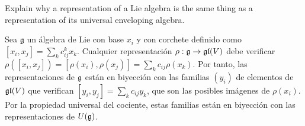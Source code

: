 \documentclass[twoside]{article}
\begin{document}
\begin{ejercicio}{}
Explain why a representation of a Lie algebra is the same thing as a representation
of its universal enveloping algebra.
\end{ejercicio}
\begin{solucion}
Sea $\mathfrak{g}$ un álgebra de Lie con base $x_i$ y con corchete definido como $[x_i,x_j]=\sum_k c_{ij}^kx_k$. Cualquier representación $\rho:\mathfrak{g}\to\mathfrak{gl}(V)$ debe verificar $\rho([x_i,x_j])=[\rho(x_i),\rho(x_j)]=\sum_kc_{ij}\rho(x_k)$. Por tanto, las representaciones de $\mathfrak{g}$ están en biyección con las familias $(y_i)$ de elementos de $\mathfrak{gl}(V)$ que verifican $[y_i,y_j]=\sum_k c_{ij}y_k$, que son las posibles imágenes de $\rho(x_i)$. Por la propiedad universal del cociente, estas familias están en biyección con las representaciones de $U(\mathfrak{g})$. 
\end{solucion}

\newpage
\end{document}
